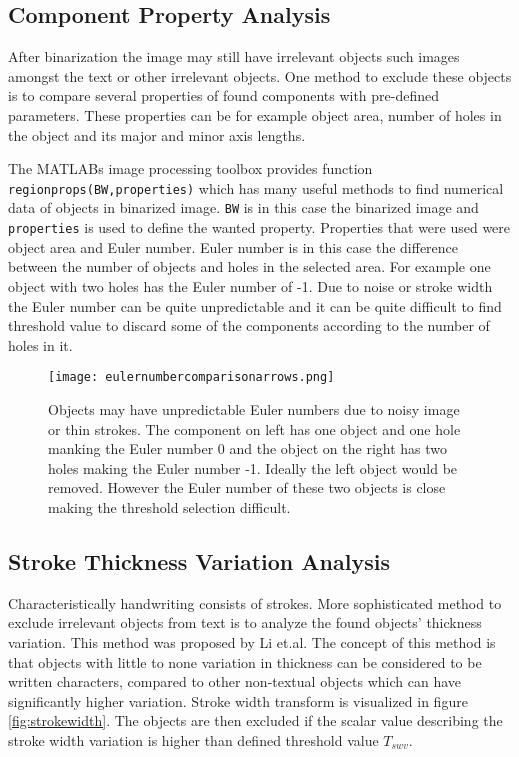 \documentclass{article}
\def\code#1{\texttt{#1}}
\begin{document}
        \subsection{Component Property Analysis}
          After binarization the image may still have irrelevant objects such images amongst the text or other irrelevant objects. One method to exclude these objects is to compare several properties of found components with pre-defined parameters. These properties can be for example object area, number of holes in the object and its major and minor axis lengths.

          The MATLABs image processing toolbox  provides function \code{regionprops(BW,properties)} which has many useful methods to find numerical data of objects in binarized image. \code{BW} is in this case the binarized image and \code{properties} is used to define the wanted property. Properties that were used were object area and Euler number. Euler number is in this case the difference between the number of objects and holes in the selected area. For example one object with two holes has the Euler number of -1. Due to noise or stroke width the Euler number can be quite unpredictable and it can be quite difficult to find threshold value to discard some of the components according to the number of holes in it.

          \begin{figure}[!ht]
            \centering
            \texttt{[image: eulernumbercomparisonarrows.png]}
            \caption{Objects may have unpredictable Euler numbers due to noisy image or thin strokes. The component on left has one object and one hole manking the Euler number 0 and the object on the right has two holes making the Euler number -1. Ideally the left object would be removed. However the Euler number of these two objects is close making the threshold selection difficult.   \label{fig:eulernumbercomp} }
          \end{figure}

        \subsection{Stroke Thickness Variation Analysis}
          Characteristically handwriting consists of strokes. More sophisticated method to exclude irrelevant objects from text is to analyze the found objects' thickness variation. This method was proposed by Li et.al. \cite{Li} The concept of this method is that objects with little to none variation in thickness can be considered to be written characters, compared to other non-textual objects which can have significantly higher variation. Stroke width transform is visualized in figure \ref{fig:strokewidth}. The objects are then excluded if the scalar value describing the stroke width variation is higher than defined threshold value $T_{swv}$.
\end{document}
